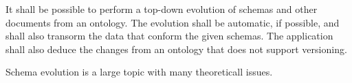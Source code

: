 \begin{requirement}
    It shall be possible to perform a top-down evolution of schemas and other documents from an ontology. The evolution shall be automatic, if possible, and shall also transorm the data that conform the given schemas. The application shall also deduce the changes from an ontology that does not support versioning.
\end{requirement}

Schema evolution is a large topic with many theoreticall issues.

